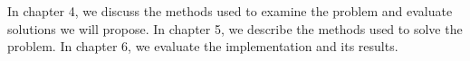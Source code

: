 In chapter 4, we discuss the methods used to examine the problem and evaluate solutions we will propose. In chapter 5, we describe the methods used to solve the problem. In chapter 6, we evaluate the implementation and its results. 



